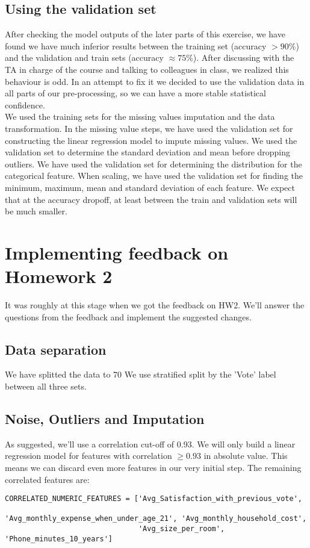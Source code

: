 \documentclass[12pt]{scrartcl}
\begin{document}
\subsection{Using the validation set}
After checking the model outputs of the later parts of this exercise, we have found we have much inferior results between the training set (accuracy $>90\%$) and the validation and train sets (accuracy $\approx 75\%$). 
After discussing with the TA in charge of the course and talking to colleagues in class, we realized this behaviour is odd. In an attempt to fix it we decided to use the validation data in all parts of our pre-processing, so we can have a more stable statistical confidence.\\
We used the training sets for the missing values imputation and the data transformation. In the missing value steps, we have used the validation set for constructing the linear regression model to impute missing values. We used the validation set to determine the standard deviation and mean before dropping outliers. We have used the validation set for determining the distribution for the categorical feature. When scaling, we have used the validation set for finding the minimum, maximum, mean and standard deviation of each feature. We expect that at the accuracy dropoff, at least between the train and validation sets will be much smaller.

\section{Implementing feedback on Homework 2}
It was roughly at this stage when we got the feedback on HW2. We'll answer the questions from the feedback and implement the suggested changes.
\subsection{Data separation}
We have splitted the data to 70%
We use stratified split by the 'Vote' label between all three sets.
\subsection{Noise, Outliers and Imputation}
As suggested, we'll use a correlation cut-off of 0.93. We will only build a linear regression model for features with correlation $\geq 0.93$ in absolute value. This means we can discard even more features in our very initial step. The remaining correlated features are:\\

\begin{adjustbox}{max width=\linewidth}
\begin{lstlisting}
CORRELATED_NUMERIC_FEATURES = ['Avg_Satisfaction_with_previous_vote',
                               'Avg_monthly_expense_when_under_age_21', 'Avg_monthly_household_cost',
                               'Avg_size_per_room', 'Phone_minutes_10_years']
\end{lstlisting}
\end{adjustbox}\\
\end{document}
